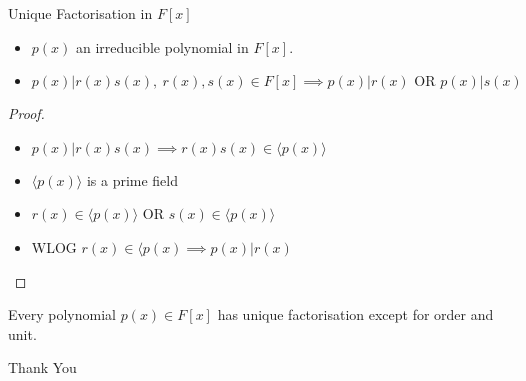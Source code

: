 \documentclass{beamer}
\begin{document}
\begin{frame}{Unique Factorisation in $F[x]$}
\begin{theorem}
\begin{itemize}
	\item $p(x)$ an irreducible polynomial in $F[x]$.
	\item $p(x) | r(x)s(x),\ r(x),s(x) \in F[x] \implies p(x) | r(x) \text{ OR } p(x) | s(x)$\\
\end{itemize}
\end{theorem}
\begin{proof}
\begin{itemize}
	\item $p(x) | r(x)s(x) \implies r(x)s(x) \in \langle p(x) \rangle$ 
	\item $\langle p(x) \rangle$ is a prime field
	\item $r(x) \in \langle p(x) \rangle$ OR $s(x) \in \langle p(x) \rangle$
	\item WLOG $r(x) \in \langle p(x) \implies p(x) | r(x)$
\end{itemize}
\end{proof}
\begin{theorem}
	Every polynomial $p(x) \in F[x]$ has unique factorisation except for order and unit.
\end{theorem}
\end{frame}

\begin{frame}
	\vspace{0.6in}
	\hspace{3cm} {\color{blue}\Huge{Thank You}}
\end{frame}
\end{document}
